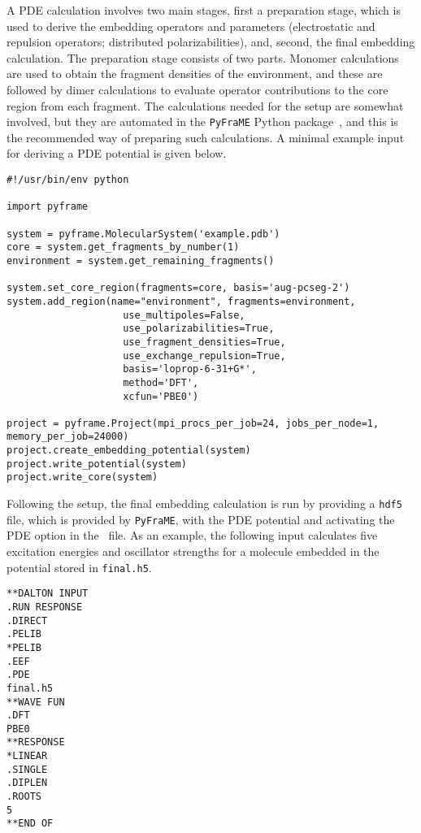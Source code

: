A PDE calculation involves two main stages, first a preparation stage, 
which is used to derive the embedding operators and parameters (electrostatic
and repulsion operators; distributed polarizabilities), and, second, the final
embedding calculation.
The preparation stage consists of two parts. Monomer calculations are used 
to obtain the fragment densities of the environment, and these are followed
by dimer calculations to evaluate operator contributions to the core region
from each fragment.
The calculations needed for the setup are somewhat involved, but they are
automated in the \verb|PyFraME| Python package~\cite{pyframe}, and this
is the recommended way of preparing such calculations.
A minimal example input for deriving a PDE potential is given below.
\begin{verbatim}
#!/usr/bin/env python

import pyframe

system = pyframe.MolecularSystem('example.pdb')
core = system.get_fragments_by_number(1)
environment = system.get_remaining_fragments()

system.set_core_region(fragments=core, basis='aug-pcseg-2')
system.add_region(name="environment", fragments=environment,
                    use_multipoles=False,
                    use_polarizabilities=True,
                    use_fragment_densities=True,
                    use_exchange_repulsion=True,
                    basis='loprop-6-31+G*',
                    method='DFT',
                    xcfun='PBE0')

project = pyframe.Project(mpi_procs_per_job=24, jobs_per_node=1, memory_per_job=24000)
project.create_embedding_potential(system)
project.write_potential(system)
project.write_core(system)
\end{verbatim}
Following the setup, the final embedding calculation is run by providing a
\verb|hdf5| file, which is provided by \verb|PyFraME|, with the PDE potential
and activating the PDE option in the \dalinp\ file.
As an example, the following input calculates five excitation energies and
oscillator strengths for a molecule embedded in the potential stored in \verb|final.h5|.
\begin{verbatim}
**DALTON INPUT
.RUN RESPONSE
.DIRECT
.PELIB
*PELIB
.EEF
.PDE
final.h5
**WAVE FUN
.DFT
PBE0
**RESPONSE
*LINEAR
.SINGLE
.DIPLEN
.ROOTS
5
**END OF
\end{verbatim}
